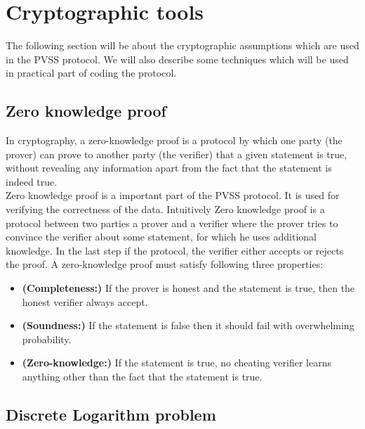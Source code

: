 \section{Cryptographic tools}
The following section will be about the cryptographic assumptions which are used in the PVSS protocol. We will also describe some techniques which will be used in practical part of coding the protocol.


\subsection{Zero knowledge proof} %
In cryptography, a zero-knowledge proof is a protocol by which one party (the prover) can prove to another party (the verifier) that a given statement is true, without revealing any information apart from the fact that the statement is indeed true.\\

\noindent
Zero knowledge proof is a important part of the PVSS protocol. It is used for verifying the correctness of the data. Intuitively Zero knowledge proof is a protocol between two parties a prover and a verifier where the prover tries to convince the verifier about some statement, for which he uses additional knowledge. In the last step if the protocol, the verifier either accepts or rejects the proof. A zero-knowledge proof must satisfy following three properties:

\begin{itemize}
\item  \textnormal{\textbf{(Completeness:)}} If the prover is honest and the statement is true, then the honest verifier always accept. 
\item    \textnormal{\textbf{(Soundness:)}} If the statement is false then it should fail with overwhelming probability. 
\item   \textnormal{\textbf{(Zero-knowledge:)}} If the statement is true, no cheating verifier learns anything other than the fact that the statement is true.
\end{itemize}


\subsection{Discrete Logarithm problem} %

